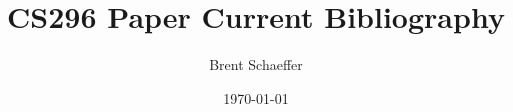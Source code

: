 \documentclass[11pt]{article}
\title{CS296 Paper Current Bibliography}
\author{Brent Schaeffer}
\date{\today}
\begin{document}
\maketitle

\cite{*}

\printbibliography
    
\end{document}
